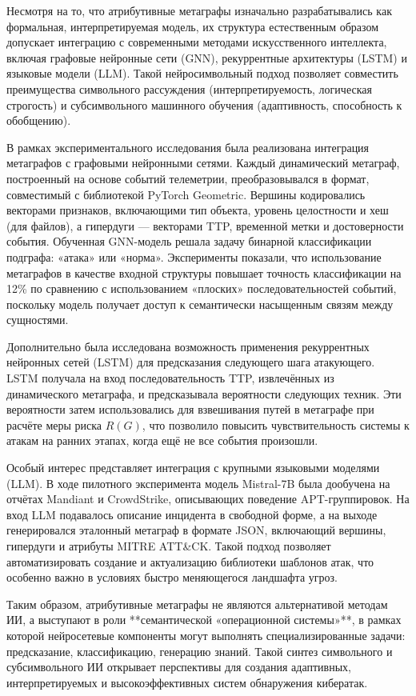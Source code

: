 Несмотря на то, что атрибутивные метаграфы изначально разрабатывались как формальная, интерпретируемая модель, их структура естественным образом допускает интеграцию с современными методами искусственного интеллекта, включая графовые нейронные сети (GNN), рекуррентные архитектуры (LSTM) и языковые модели (LLM). Такой нейросимвольный подход позволяет совместить преимущества символьного рассуждения (интерпретируемость, логическая строгость) и субсимвольного машинного обучения (адаптивность, способность к обобщению).

В рамках экспериментального исследования была реализована интеграция метаграфов с графовыми нейронными сетями. Каждый динамический метаграф, построенный на основе событий телеметрии, преобразовывался в формат, совместимый с библиотекой PyTorch Geometric. Вершины кодировались векторами признаков, включающими тип объекта, уровень целостности и хеш (для файлов), а гипердуги — векторами TTP, временной метки и достоверности события. Обученная GNN-модель решала задачу бинарной классификации подграфа: «атака» или «норма». Эксперименты показали, что использование метаграфов в качестве входной структуры повышает точность классификации на 12\% по сравнению с использованием «плоских» последовательностей событий, поскольку модель получает доступ к семантически насыщенным связям между сущностями.

Дополнительно была исследована возможность применения рекуррентных нейронных сетей (LSTM) для предсказания следующего шага атакующего. LSTM получала на вход последовательность TTP, извлечённых из динамического метаграфа, и предсказывала вероятности следующих техник. Эти вероятности затем использовались для взвешивания путей в метаграфе при расчёте меры риска $R(G)$, что позволило повысить чувствительность системы к атакам на ранних этапах, когда ещё не все события произошли.

Особый интерес представляет интеграция с крупными языковыми моделями (LLM). В ходе пилотного эксперимента модель Mistral-7B была дообучена на отчётах Mandiant и CrowdStrike, описывающих поведение APT-группировок. На вход LLM подавалось описание инцидента в свободной форме, а на выходе генерировался эталонный метаграф в формате JSON, включающий вершины, гипердуги и атрибуты MITRE ATT\&CK. Такой подход позволяет автоматизировать создание и актуализацию библиотеки шаблонов атак, что особенно важно в условиях быстро меняющегося ландшафта угроз.

Таким образом, атрибутивные метаграфы не являются альтернативой методам ИИ, а выступают в роли **семантической «операционной системы»**, в рамках которой нейросетевые компоненты могут выполнять специализированные задачи: предсказание, классификацию, генерацию знаний. Такой синтез символьного и субсимвольного ИИ открывает перспективы для создания адаптивных, интерпретируемых и высокоэффективных систем обнаружения кибератак.

